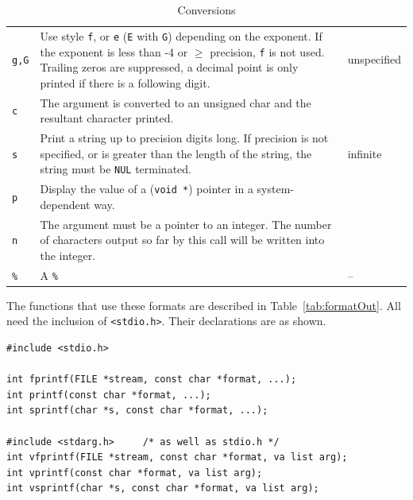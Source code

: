 \begin{table}[htb]
\begin{tabular}{lp{}p{}}
        \texttt{g,G} & Use style \texttt{f}, or \texttt{e} (\texttt{E} with
                       \texttt{G}) depending on the exponent.  If the exponent is less
                       than -4 or $\geq$ precision, \texttt{f} is not
                       used.  Trailing zeros are suppressed, a decimal point is only
                       printed if there is a following digit. & un\-specified  \\

        \texttt{c} & The \kint{} argument is converted
                     to an unsigned char and the
                     resultant character printed. &     \\

        \texttt{s} & Print a string up to precision digits long. If
                     precision is not specified, or is greater than the
                     length of the string, the string must be \texttt{NUL}
                     terminated. & infinite    \\

        \texttt{p} & Display the value of a (\texttt{void *}) pointer in a
                     system-dependent way. &     \\

        \texttt{n} & The argument must be a pointer to an integer.  The number of
                     characters output so far by this call will be written into
                     the integer. &     \\

        \texttt{\%} & A \texttt{\%} & --        \\
        \bottomrule
      \end{tabular}
  \caption{\label{tab:conv}Conversions}
\end{table}



   The functions that use these formats are described in
    Table~\ref{tab:formatOut}.  All need the inclusion of
    \texttt{<stdio.h>}.  Their declarations are as shown.


   \begin{Verbatim}
#include <stdio.h>

int fprintf(FILE *stream, const char *format, ...);
int printf(const char *format, ...);
int sprintf(char *s, const char *format, ...);

#include <stdarg.h>     /* as well as stdio.h */
int vfprintf(FILE *stream, const char *format, va list arg);
int vprintf(const char *format, va list arg);
int vsprintf(char *s, const char *format, va list arg);
\end{Verbatim}


